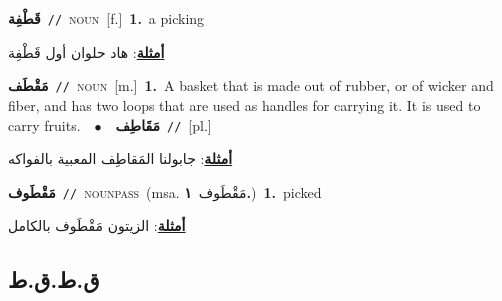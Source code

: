 \documentclass[10pt,a4paper,twoside]{article} %
\begin{document}
\begin{multicols}{2}
{\setlength\topsep{0pt}\textbf{\foreignlanguage{arabic}{قَطْفِة}}\ {\color{gray}\texttt{//}\color{black}}\ \textsc{noun}\ [f.]\ \textbf{1.}~a picking\  \begin{flushright}\color{gray}\foreignlanguage{arabic}{\textbf{\underline{\foreignlanguage{arabic}{أمثلة}}}: هاد حلوان أول قَطْفِة}\end{flushright}\color{black}} \vspace{2mm}

{\setlength\topsep{0pt}\textbf{\foreignlanguage{arabic}{مَقْطَف}}\ {\color{gray}\texttt{//}\color{black}}\ \textsc{noun}\ [m.]\ \textbf{1.}~A  basket that is made out of rubber, or of wicker and fiber, and has two loops that are used as handles for carrying it. It is used to carry fruits.\ \ $\bullet$\ \ \setlength\topsep{0pt}\textbf{\foreignlanguage{arabic}{مَقَاطِف}}\ {\color{gray}\texttt{//}\color{black}}\ [pl.]\  \begin{flushright}\color{gray}\foreignlanguage{arabic}{\textbf{\underline{\foreignlanguage{arabic}{أمثلة}}}: جابولنا المَقاطِف المعبية بالفواكه}\end{flushright}\color{black}} \vspace{2mm}

{\setlength\topsep{0pt}\textbf{\foreignlanguage{arabic}{مَقْطَوف}}\ {\color{gray}\texttt{//}\color{black}}\ \textsc{noun\textunderscore pass}\ \color{gray}(msa. \foreignlanguage{arabic}{مَقْطَوف}~\foreignlanguage{arabic}{\textbf{١.}})\color{black}\ \textbf{1.}~picked\  \begin{flushright}\color{gray}\foreignlanguage{arabic}{\textbf{\underline{\foreignlanguage{arabic}{أمثلة}}}: الزيتون مَقْطَوف بالكامل}\end{flushright}\color{black}} \vspace{2mm}

\vspace{-3mm}
\subsection*{\color{blue}\foreignlanguage{arabic}{ق.ط.ق.ط}\color{blue}{}} 


\end{multicols}
\end{document}
